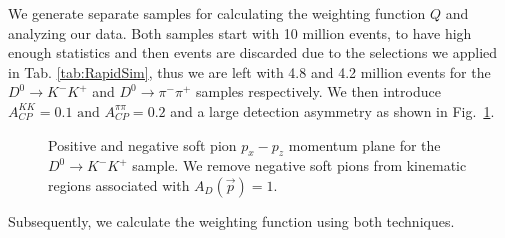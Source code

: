 \documentclass{article}
\begin{document}
        We generate separate samples for calculating the weighting function $Q$ and analyzing our data.
        Both samples start with 10 million events, to have high enough statistics and then events are discarded due to the selections we applied in Tab. \ref{tab:RapidSim}, thus we are left with 4.8 and 4.2 million events for the $D^0 \to K^-K^+$ and $D^0 \to \pi^-\pi^+$ samples respectively.
        We then introduce $A_{CP}^{KK} = 0.1 \text{ and } A_{CP}^{\pi\pi} = 0.2$ and a large detection asymmetry as shown in Fig.~\ref{fig:detection}.
        \begin{figure}[h!]
                \centering
                \caption{Positive and negative soft pion $p_x - p_z$ momentum plane for the $D^0\to K^-K^+$ sample.
                We remove negative soft pions from kinematic regions associated with $A_D(\vec{p}) = 1$.}
                \label{fig:detection}
        \end{figure}
        Subsequently, we calculate the weighting function using both techniques.
\end{document}
